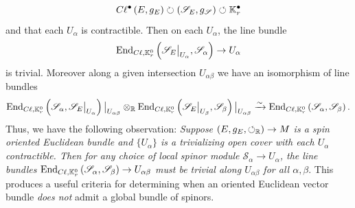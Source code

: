\documentclass[openany, 11pt]{article}
\theoremstyle{definition}
\theoremstyle{remark}
\def\lp{\ensuremath{\left(}}
\def\rp{\ensuremath{\right)}}
\def\Sc{\ensuremath{\mathscr{S}}}
\def\cal{\ensuremath{\boldsymbol{\circlearrowleft}}}
\def\bR{\ensuremath{\mathbb{R}}}
\def\bK{\ensuremath{\mathbb{K}}}
\def\End{\ensuremath{\textnormal{End}}}
\begin{document}
\[
    C\ell^{\bullet}\lp E,g_E\rp\circlearrowright\lp\Sc_E,g_{\Sc}\rp\circlearrowleft\bK^{\bullet}_r
\]
and that each $U_{\alpha}$ is contractible. Then on each $U_{\alpha}$, the line bundle
\[
    \End_{C\ell,\bK^0_r}\lp \Sc_E\big|_{U_{\alpha}},\Sc_{\alpha}\rp\rightarrow U_{\alpha}
\]
is trivial. Moreover along a given intersection $U_{\alpha\beta}$ we have an isomorphism of line bundles
\begin{align*}
    \End_{C\ell,\bK^0_r}\lp\Sc_{\alpha},\Sc_E\big|_{U_{\alpha}}\rp\big|_{U_{\alpha\beta}}\otimes_{\bR}\End_{C\ell,\bK^0_r}\lp\Sc_E\big|_{U_{\beta}},\Sc_{\beta}\rp\big|_{U_{\alpha\beta}}\xrightarrow{\sim}\End_{C\ell,\bK^0_r}\lp\Sc_{\alpha},\Sc_{\beta}\rp.
\end{align*}
Thus, we have the following observation: \emph{Suppose $\lp E,g_E,\cal_{\bR}\rp\rightarrow M$ is a spin oriented Euclidean bundle and $\{U_{\alpha}\}$ is a trivializing open cover with each $U_{\alpha}$ contractible. Then for any choice of local spinor module $\Sc_{\alpha}\rightarrow U_{\alpha}$, the line bundles $\End_{C\ell,\bK^0_r}\lp\Sc_{\alpha},\Sc_{\beta}\rp\rightarrow U_{\alpha\beta}$ must be trivial along $U_{\alpha\beta}$ for all $\alpha,\beta$}. This produces a useful criteria for determining when an oriented Euclidean vector bundle \emph{does not} admit a global bundle of spinors.
\end{document}
